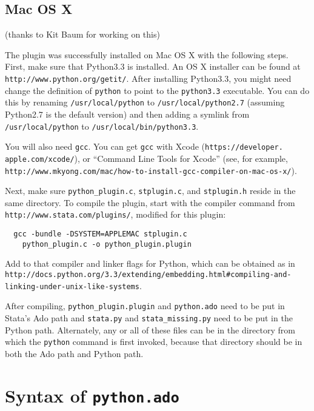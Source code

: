 \documentclass{article}
\begin{document}
	
\subsection{Mac OS X}

{\small (thanks to Kit Baum for working on this)}\newline

The plugin was successfully installed on Mac OS X with the following steps. First, make sure that Python3.3 is installed. An OS X installer can be found at \lstinline{http://www.python.org/getit/}. After installing Python3.3, you might need change the definition of \lstinline{python} to point to the \lstinline{python3.3} executable. You can do this by renaming \lstinline{/usr/local/python} to \lstinline{/usr/local/python2.7} (assuming Python2.7 is the default version) and then adding a symlink from \lstinline{/usr/local/python} to \lstinline{/usr/local/bin/python3.3}.

You will also need \lstinline{gcc}. You can get \lstinline{gcc} with Xcode (\lstinline{https://developer.} \lstinline{apple.com/xcode/}), or ``Command Line Tools for Xcode'' (see, for example, \lstinline{http://www.mkyong.com/mac/how-to-install-gcc-compiler-on-mac-os-x/}).

Next, make sure \lstinline{python_plugin.c}, \lstinline{stplugin.c}, and \lstinline{stplugin.h} reside in the same directory. To compile the plugin, start with the compiler command from \lstinline{http://www.stata.com/plugins/}, modified for this plugin:
\begin{lstlisting}
  gcc -bundle -DSYSTEM=APPLEMAC stplugin.c 
    python_plugin.c -o python_plugin.plugin
\end{lstlisting}
Add to that compiler and linker flags for Python, which can be obtained as in \newline
\lstinline{http://docs.python.org/3.3/extending/embedding.html#compiling-and-} \newline \lstinline{linking-under-unix-like-systems}.

After compiling, \lstinline{python_plugin.plugin} and \lstinline{python.ado} need to be put in Stata's Ado path and \lstinline{stata.py} and \lstinline{stata_missing.py} need to be put in the Python path. Alternately, any or all of these files can be in the directory from which the \lstinline{python} command is first invoked, because that directory should be in both the Ado path and Python path.



\section{Syntax of \lstinline$python.ado$} \label{syntax}
\end{document}
